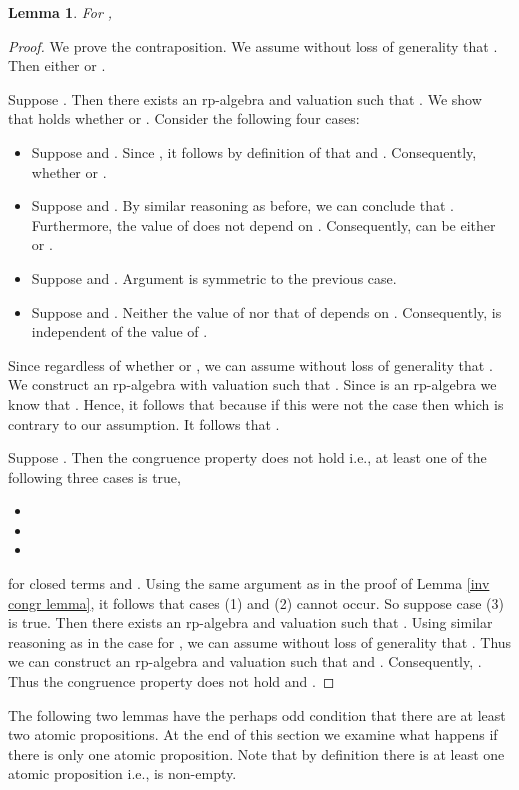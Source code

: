 \documentclass[a4paper,twoside,openright]{report}
\newtheorem{lem}[theorem]{Lemma}
\begin{document}
\begin{lem}
For ,

\end{lem}
\begin{proof}
We prove the contraposition. We assume without loss of generality that . Then either  or .

Suppose . Then there exists an rp-algebra  and valuation  such that . We show that  holds whether  or . Consider the following four cases:
\begin{itemize}
\item Suppose  and . Since , it follows by definition of  that  and . Consequently,  whether  or .
\item Suppose  and . By similar reasoning as before, we can conclude that . Furthermore, the value of  does not depend on . Consequently,  can be either  or .
\item Suppose  and . Argument is symmetric to the previous case.
\item Suppose  and . Neither the value of  nor that of  depends on . Consequently,  is independent of the value of .
\end{itemize}
Since  regardless of whether  or , we can assume without loss of generality that . We construct an rp-algebra  with valuation  such that . Since  is an rp-algebra we know that . Hence, it follows that  because if this were not the case then  which is contrary to our assumption. It follows that .

Suppose . Then the congruence property does not hold i.e., at least one of the following three cases is true,
\begin{itemize}
\item[(1)] 
\item[(2)] 
\item[(3)] 
\end{itemize}
for closed terms  and . Using the same argument as in the proof of Lemma \ref{inv congr lemma}, it follows that cases (1) and (2) cannot occur. So suppose case (3) is true. Then there exists an rp-algebra  and valuation  such that . Using similar reasoning as in the case for , we can assume without loss of generality that . Thus we can construct an rp-algebra  and valuation  such that  and . Consequently, . Thus the congruence property does not hold and .
\end{proof}

The following two lemmas have the perhaps odd condition that there are at least two atomic propositions. At the end of this section we examine what happens if there is only one atomic proposition. Note that by definition there is at least one atomic proposition i.e.,  is non-empty.
\end{document}
